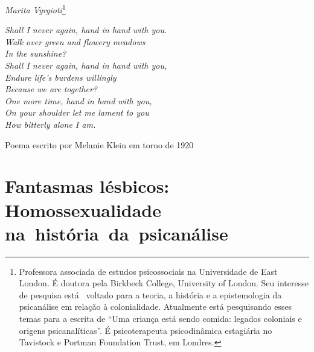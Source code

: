 \begin{flushright}
\emph{Marita Vyrgioti}\footnote{Professora associada de estudos psicossociais na Universidade
de East London. É doutora pela Birkbeck College, University of London. Seu
interesse de pesquisa está  voltado para a teoria, a história e a epistemologia da
psicanálise em relação à colonialidade. Atualmente está pesquisando esses temas
para a escrita de ``Uma criança está sendo comida: legados coloniais e origens
psicanalíticas''. É psicoterapeuta psicodinâmica estagiária no Tavistock e
Portman  Foundation Trust, em Londres.}
\end{flushright}

\epigraph{\emph{Shall I never again, hand in hand with you.\\
Walk over green and flowery meadows\\
In the sunshine?\\
Shall I never again, hand in hand with you,\\
Endure life's burdens willingly\\
Because we are together?\\
One more time, hand in hand with you,\\
On your shoulder let me lament to you\\
How bitterly alone I am.}}{Poema escrito por Melanie Klein em torno de 1920}

\section{Fantasmas lésbicos: Homossexualidade na~história~da~psicanálise}

